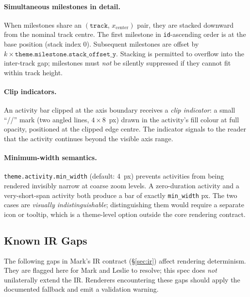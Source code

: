 \paragraph{Simultaneous milestones in detail.}

When milestones share an $(\texttt{track},\,x_{\text{center}})$ pair, they are stacked downward
from the nominal track centre. The first milestone in \texttt{id}-ascending order is at the
base position (stack index 0). Subsequent milestones are offset by
$k \times \texttt{theme.milestone.stack\_offset\_y}$. Stacking is permitted to overflow into
the inter-track gap; milestones must \emph{not} be silently suppressed if they cannot fit
within track height.

\paragraph{Clip indicators.}

An activity bar clipped at the axis boundary receives a \emph{clip indicator}: a small
``/\!/'' mark (two angled lines, $4 \times 8$~px) drawn in the activity's fill colour at
full opacity, positioned at the clipped edge centre. The indicator signals to the reader
that the activity continues beyond the visible axis range.

\paragraph{Minimum-width semantics.}

\texttt{theme.activity.min\_width} (default: 4~px) prevents activities from being rendered
invisibly narrow at coarse zoom levels. A zero-duration activity and a very-short-span
activity both produce a bar of exactly \texttt{min\_width} px. The two cases are
\emph{visually indistinguishable}; distinguishing them would require a separate icon or
tooltip, which is a theme-level option outside the core rendering contract.

\subsection{Known IR Gaps}
\label{sec:rendering-gaps}

The following gaps in Mark's IR contract (\S\ref{sec:ir}) affect rendering determinism.
They are flagged here for Mark and Leslie to resolve; this spec does \emph{not} unilaterally
extend the IR. Renderers encountering these gaps should apply the documented fallback and
emit a validation warning.

